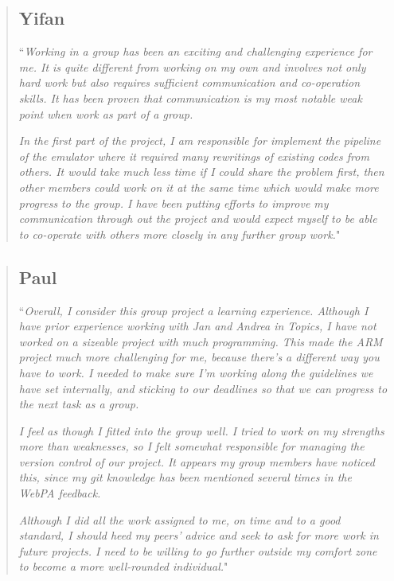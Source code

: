 \documentclass[9pt]{article}
\begin{document}
\pagebreak
\begin{quote}
\subsection*{Yifan}
``\textit{Working in a group has been an exciting and challenging experience for me. It is quite different from working on my own and involves not only hard work but also requires sufficient communication and co-operation skills. It has been proven that communication is my most notable weak point when work as part of a group.}

\textit{In the first part of the project, I am responsible for implement the pipeline of the emulator where it required many rewritings of existing codes from others. It would take much less time if I could share the problem first, then other members could work on it at the same time which would make more progress to the group. I have been putting efforts to improve my communication through out the project and would expect myself to be able to co-operate with others more closely in any further group work.}"
\end{quote}

\begin{quote}
\subsection*{Paul}
``\textit{Overall, I consider this group project a learning experience. Although I have prior experience working with Jan and Andrea in Topics, I have not worked on a sizeable project with much programming. This made the ARM project much more challenging for me, because there's a different way you have to work. I needed to make sure I'm working along the guidelines we have set internally, and sticking to our deadlines so that we can progress to the next task as a group.}

\textit{I feel as though I fitted into the group well. I tried to work on my strengths more than weaknesses, so I felt somewhat responsible for managing the version control of our project. It appears my group members have noticed this, since my git knowledge has been mentioned several times in the WebPA feedback.}

\textit{Although I did all the work assigned to me, on time and to a good standard, I should heed my peers' advice and seek to ask for more work in future projects. I need to be willing to go further outside my comfort zone to become a more well-rounded individual.}"
\end{quote}
\end{document}

